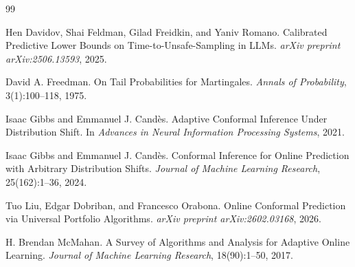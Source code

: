 \documentclass[11pt]{article}
\newcommand{\1}{\mathbf{1}}
\begin{document}

\begin{thebibliography}{99}

Hen Davidov, Shai Feldman, Gilad Freidkin, and Yaniv Romano.
\newblock Calibrated Predictive Lower Bounds on Time-to-Unsafe-Sampling in LLMs.
\newblock \emph{arXiv preprint arXiv:2506.13593}, 2025.

David A. Freedman.
\newblock On Tail Probabilities for Martingales.
\newblock \emph{Annals of Probability}, 3(1):100--118, 1975.

Isaac Gibbs and Emmanuel J. Cand\`es.
\newblock Adaptive Conformal Inference Under Distribution Shift.
\newblock In \emph{Advances in Neural Information Processing Systems}, 2021.

Isaac Gibbs and Emmanuel J. Cand\`es.
\newblock Conformal Inference for Online Prediction with Arbitrary Distribution Shifts.
\newblock \emph{Journal of Machine Learning Research}, 25(162):1--36, 2024.

Tuo Liu, Edgar Dobriban, and Francesco Orabona.
\newblock Online Conformal Prediction via Universal Portfolio Algorithms.
\newblock \emph{arXiv preprint arXiv:2602.03168}, 2026.

H. Brendan McMahan.
\newblock A Survey of Algorithms and Analysis for Adaptive Online Learning.
\newblock \emph{Journal of Machine Learning Research}, 18(90):1--50, 2017.

\end{thebibliography}
\end{document}
